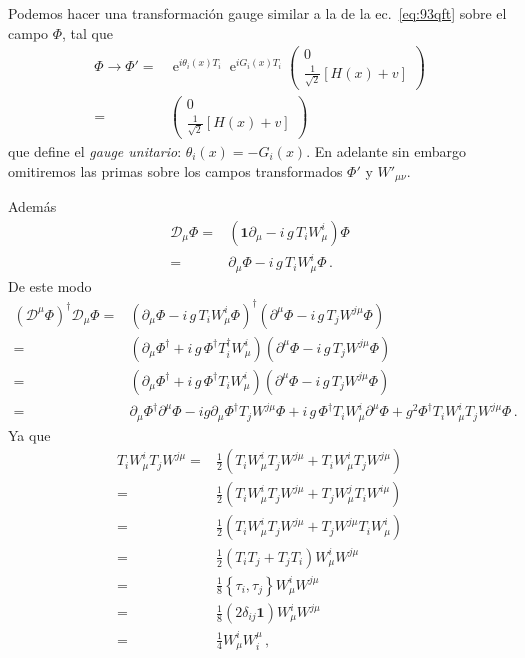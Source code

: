 \begin{frame}
Podemos hacer una transformación gauge similar a la de la 
ec.~\eqref{eq:93qft} sobre el campo $\Phi$, tal que
\begin{align}
  \label{eq:123qft}
    {\Phi}\to{\Phi}'=&\operatorname{e}^{i \theta_i(x) T_i}\operatorname{e}^{i G_i(x) T_i}
  \begin{pmatrix}
    0\\
    \frac{1}{\sqrt{2}}[H(x)+v]
  \end{pmatrix}\nonumber\\
  =&\begin{pmatrix}
    0\\
    \frac{1}{\sqrt{2}}[H(x)+v]
  \end{pmatrix}
\end{align}
que define el \emph{gauge unitario}: $\theta_i(x)=-G_i(x)$. En adelante sin embargo omitiremos las primas sobre los campos transformados ${\Phi}'$ y $W'_{\mu\nu}$.
\end{frame}
Además
\begin{align}
\mathcal{D}_{\mu} \Phi =& \left( \boldsymbol{1}\partial_{\mu}-i\,g\,T_i W^i_{\mu} \right)\Phi \nonumber\\
=&  \partial_{\mu}\Phi -i\,g\,T_i W^i_{\mu}\Phi \,.
\end{align}
De este modo
\begin{align}
  \left( \mathcal{D}^{\mu} \Phi \right)^{\dagger}  \mathcal{D}_{\mu} \Phi
=&\left(\partial_{\mu}\Phi -i\,g\,T_i W^i_{\mu}\Phi \right)^{\dagger}
\left( \partial^{\mu}\Phi -i\,g\,T_j W^{j\mu}\Phi \right) \nonumber\\
=&\left( \partial_{\mu}\Phi^{\dagger} +i\,g\,\Phi^{\dagger}T_i^{\dagger} W^i_{\mu} \right)
\left( \partial^{\mu}\Phi -i\,g\,T_j W^{j\mu}\Phi \right) \nonumber\\
=&\left(\partial_{\mu}\Phi^{\dagger} +i\,g\,\Phi^{\dagger}T_i W^i_{\mu} \right)
\left( \partial^{\mu}\Phi -i\,g\,T_j W^{j\mu}\Phi \right) \nonumber\\
 =& \partial_{\mu}\Phi^{\dagger} \partial^{\mu}\Phi -ig \partial_{\mu}\Phi^{\dagger} T_j W^{j\mu} \Phi
     +i\,g\,\Phi^{\dagger}T_i W^i_{\mu} \partial^{\mu}\Phi
   +g^2 \Phi^{\dagger} T_i W^i_{\mu}  T_j W^{j\mu} \Phi\,.
\end{align}
Ya que
\begin{align}
  T_i W^i_{\mu}  T_j W^{j\mu} = &\frac{1}{2}\left( T_i W^i_{\mu}  T_j W^{j\mu} +T_i W^i_{\mu}  T_j W^{j\mu}    \right)\nonumber\\
  = &\frac{1}{2}\left( T_i W^i_{\mu}  T_j W^{j\mu} +T_j W^j_{\mu}  T_i W^{i\mu}    \right)\nonumber\\
  = &\frac{1}{2}\left( T_i W^i_{\mu}  T_j W^{j\mu} +T_j W^{j\mu}  T_i W^{i}_{\mu}    \right)\nonumber\\
  = &\frac{1}{2}\left( T_i  T_j  +T_j T_i \right)W^i_{\mu}W^{j\mu}\nonumber\\
   = &\frac{1}{8} \left\{ \tau_i , \tau_j \right\} W^i_{\mu}W^{j\mu}\nonumber\\
  = &\frac{1}{8}\left( 2 \delta_{ij} \boldsymbol{1} \right)W^i_{\mu}W^{j\mu}\nonumber\\
  = &\frac{1}{4}W^i_{\mu}W^{\mu}_{i}\,,
\end{align}
